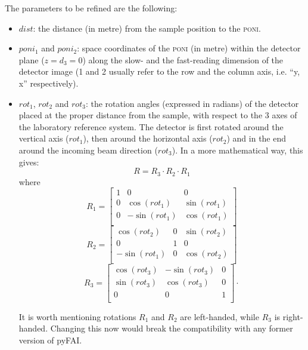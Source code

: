 \documentclass[preprint]{iucr}              %
\begin{document}
The parameters to be refined are the following:
\begin{itemize}
  \item $dist$: the distance (in metre) from the sample position to the
  \textsc{poni}.
  \item $poni_1$ and $poni_2$: space coordinates of the
  \textsc{poni} (in metre) within the detector plane ($z=d_3=0$) along the slow-
  and the fast-reading dimension of the detector image (1 and 2 usually refer to the row
  and the column axis, i.e. ``y, x'' respectively).
  \item $rot_1$, $rot_2$ and $rot_3$: the
  rotation angles (expressed in radians) of the detector placed at the proper
  distance from the sample, with respect to the 3 axes of the
  laboratory reference system.
  The detector is first rotated around the vertical axis ($rot_1$), then
  around the horizontal axis ($rot_2$) and in the end around the
  incoming beam direction ($rot_3$). In a more mathematical way, this gives:
\begin{equation}
	R = R_3 \cdot R_2 \cdot R_1 
\end{equation}
where
\begin{equation}
	R_1 = 	
	\begin{bmatrix}
	1 & 0 & 0\\
	0 & \cos(rot_1) & \sin(rot_1) \\
	0 & -\sin(rot_1) & \cos(rot_1) \\
	\end{bmatrix}
\end{equation}
\begin{equation} 		
	R_2 =
	\begin{bmatrix}
	\cos(rot_2) & 0 & \sin(rot_2) \\
	0 & 1 & 0 \\
	-\sin(rot_1)&0 & \cos(rot_2) \\
	\end{bmatrix}
\end{equation}
\begin{equation} 	
	R_3 =
	\begin{bmatrix}
	\cos(rot_3) & -\sin(rot_3) & 0 \\
	\sin(rot_3) & \cos(rot_3) & 0\\
	0 & 0 & 1\\
	\end{bmatrix}
	\cdot 
\end{equation}

It is worth mentioning rotations $R_1$ and $R_2$ are left-handed, while 
$R_3$ is right-handed. Changing this now would break the compatibility with
any former version of pyFAI.
\end{itemize}
\end{document}
